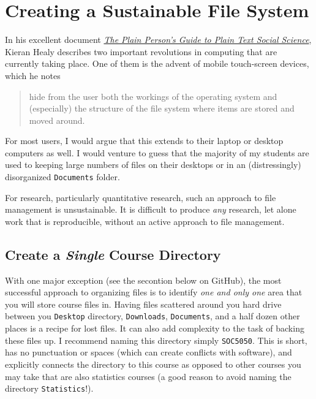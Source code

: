\documentclass[]{book}
\begin{document}
\section{Creating a Sustainable File
System}\label{creating-a-sustainable-file-system}

In his excellent document \href{http://plain-text.co}{\emph{The Plain
Person's Guide to Plain Text Social Science}}, Kieran Healy describes
two important revolutions in computing that are currently taking place.
One of them is the advent of mobile touch-screen devices, which he notes

\begin{quote}
hide from the user both the workings of the operating system and
(especially) the structure of the file system where items are stored and
moved around.
\end{quote}

For most users, I would argue that this extends to their laptop or
desktop computers as well. I would venture to guess that the majority of
my students are used to keeping large numbers of files on their desktops
or in an (distressingly) disorganized \texttt{Documents} folder.

For research, particularly quantitative research, such an approach to
file management is unsustainable. It is difficult to produce \emph{any}
research, let alone work that is reproducible, without an active
approach to file management.

\subsection{\texorpdfstring{Create a \emph{Single} Course
Directory}{Create a Single Course Directory}}\label{create-a-single-course-directory}

With one major exception (see the secontion below on GitHub), the most
successful approach to organizing files is to identify \emph{one and
only one} area that you will store course files in. Having files
scattered around you hard drive between you \texttt{Desktop} directory,
\texttt{Downloads}, \texttt{Documents}, and a half dozen other places is
a recipe for lost files. It can also add complexity to the task of
backing these files up. I recommend naming this directory simply
\texttt{SOC5050}. This is short, has no punctuation or spaces (which can
create conflicts with software), and explicitly connects the directory
to this course as opposed to other courses you may take that are also
statistics courses (a good reason to avoid naming the directory
\texttt{Statistics}!).
\end{document}
